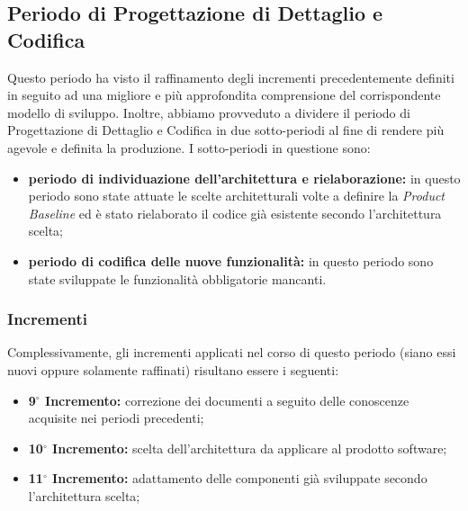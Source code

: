 
\subsection{Periodo di Progettazione di Dettaglio e Codifica}
Questo periodo ha visto il raffinamento degli incrementi precedentemente definiti in seguito ad una migliore e più approfondita comprensione del corrispondente modello di sviluppo. Inoltre, abbiamo provveduto a dividere il periodo di Progettazione di Dettaglio e Codifica in due sotto-periodi al fine di rendere più agevole e definita la produzione. I sotto-periodi in questione sono:
\begin{itemize}
	\item \textbf{periodo di individuazione dell'architettura e rielaborazione:} in questo periodo sono state attuate le scelte architetturali volte a definire la \textit{Product Baseline} ed è stato rielaborato il codice già esistente secondo l'architettura scelta;
	\item \textbf{periodo di codifica delle nuove funzionalità:} in questo periodo sono state sviluppate le funzionalità obbligatorie mancanti.
\end{itemize}

\subsubsection{Incrementi}
Complessivamente, gli incrementi applicati nel corso di questo periodo (siano essi nuovi oppure solamente raffinati) risultano essere i seguenti:

\begin{itemize}
	\item \textbf{9$^{\circ}$ Incremento:} correzione dei documenti a seguito delle conoscenze acquisite nei periodi precedenti;
	\item \textbf{10$^{\circ}$ Incremento:} scelta dell'architettura da applicare al prodotto software;
	\item \textbf{11$^{\circ}$ Incremento:} adattamento delle componenti già sviluppate secondo l’architettura scelta;
\end{itemize}

